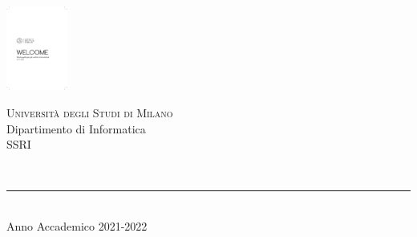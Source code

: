 
\thispagestyle{empty} %

	\noindent %
	\centering
	\includegraphics[width=0.15\textwidth]{img/unimi.pdf}\\
	\vspace{0.4 em}
	\begin{minipage}[b]{0.7\textwidth}
		\centering
		{\Large {\textsc{Universit{\`a} degli Studi di Milano}}}\\
		\vspace{0.4 em}
		{\large {Dipartimento di Informatica}}\\
		\vspace{0.4 em}
        {\large {SSRI}}
		\vspace{0.6 em}
	\end{minipage}%
	
	\vspace{5 em}

	\begin{center}
		
		{\large {\textsc{\esame}}}\\ %
		{\large {\textsc{\prog}}} %
		\vspace{4 em}
		
		{\Huge {\titolo}} %
		\vspace{10 em}
		
		\centering{\makebox[380pt][c]{{\textbf{ \textit \studente}}}   }
		\centering{\makebox[380pt][c]{{\textbf{ \textit \matr}}}   }

		\vspace{6 em}
		\vfill
		
	    {\rule{380pt}{.4pt}}\\
		\vspace{1.2 em}
		\large{{Anno Accademico 2021-2022}} %
		
		
		
		
	\end{center}

